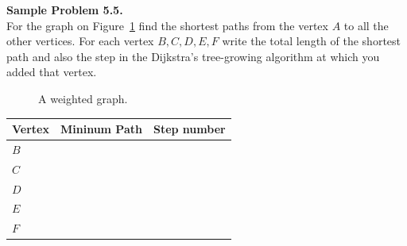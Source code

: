 \documentclass[jou]{apa6}
\begin{document}
\vspace{6pt}
{\bf Sample Problem 5.5.}\\ For the graph on Figure~\ref{fig:dijkstra-graph} 
find the shortest paths from the vertex $A$ 
to all the other vertices. For each vertex $B,C,D,E,F$ write the total length of the 
shortest path and also the step in the Dijkstra's tree-growing algorithm at which you added that vertex. 

\begin{figure}[!htb]
\caption{\label{fig:dijkstra-graph} A weighted graph.}
\end{figure}

\begin{tabular}{|l|c|c|} \hline
Vertex & Mininum Path & Step number \\ \hline
$B$ & & \\ \hline
$C$ & & \\ \hline
$D$ & & \\ \hline
$E$ & & \\ \hline
$F$ & & \\ \hline
\end{tabular}
\end{document}
